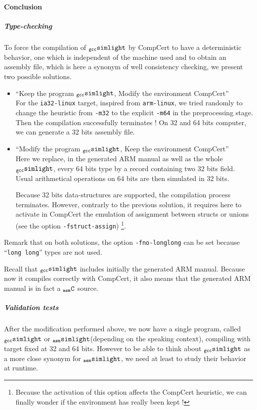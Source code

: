\documentclass[a4paper, 11pt]{article}
\newcommand{\ccert}{CompCert\xspace}
\newcommand{\gccSL}{$_{\tt gcc}{\tt simlight}$\xspace}
\newcommand{\aSL}{$_{\tt asm}{\tt simlight}$\xspace} %
\newcommand{\aC}{$_{\tt asm}{\tt C}$\xspace}
\begin{document}
\paragraph{Conclusion}
\subparagraph{Type-checking}
To force the compilation of \gccSL by \ccert to have a deterministic behavior, one which is independent of the machine used and to obtain an assembly file, which is here a synonym of well consistency checking, we present two possible solutions.
\begin{itemize}
\item ``Keep the program \gccSL, Modify the environment \ccert''\\
For the \verb|ia32-linux| target, inspired from \verb|arm-linux|, we tried randomly to change the heuristic from \verb|-m32| to the explicit \verb|-m64| in the preprocessing stage. Then the compilation successfully terminates ! On 32 and 64 bits computer, we can generate a 32 bits assembly file.

\item ``Modify the program \gccSL, Keep the environment \ccert''\\
Here we replace, in the generated ARM manual as well as the whole \gccSL, every 64 bits type by a record containing two 32 bits field. Usual arithmetical operations on 64 bits are then simulated in 32 bits. 

Because 32 bits data-structures are supported, the compilation process terminates. 
However, contrarly to the previous solution, it requires here to activate in \ccert the emulation of assignment between structs or unions (see the option \verb|-fstruct-assign|) \footnote{Because the activation of this option affects the \ccert heuristic, we can finally wonder if the environment has really been kept !}.
\end{itemize}

Remark that on both solutions, the option \verb|-fno-longlong| can be set because ``\verb|long long|'' types are not used.

Recall that \gccSL includes initially the generated ARM manual. Because now it compiles correctly with \ccert, it also means that the generated ARM manual is in fact a \aC source.

\subparagraph{Validation tests}
\label{s:valid_test}
After the modification performed above, we now have a single program, called \gccSL or \aSL (depending on the speaking context), compiling with target fixed at 32 and 64 bits. However to be able to think about \gccSL as a more close synonym for \aSL, we need at least to study their behavior at runtime. 
\end{document}

